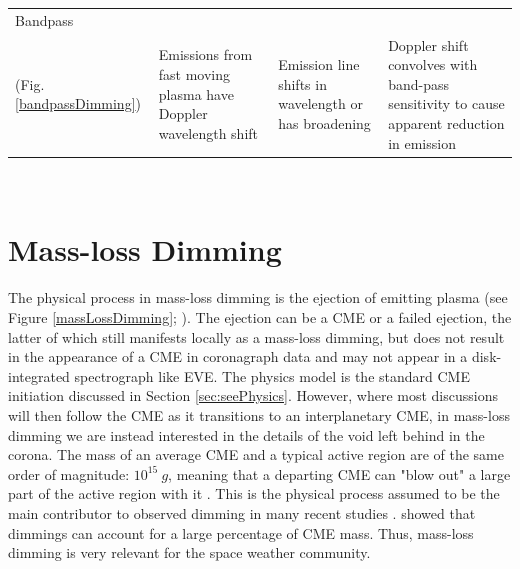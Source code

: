 \begin{table}[!h]
\begin{center}
\begin{tabular}{|p{2.5cm}|p{4cm}|p{4cm}|p{4cm}|}
	Bandpass \\ (Fig. \ref{bandpassDimming}) & Emissions from fast moving plasma have Doppler wavelength shift & Emission line shifts in wavelength or has broadening & Doppler shift convolves with band-pass sensitivity to cause apparent reduction in emission \\ \hline
	
	\end{tabular}
    \\ \rule{0mm}{5mm}
    \end{center}
    \label{tablesummary}
\end{table}

\section{Mass-loss Dimming}
The physical process in mass-loss dimming is the ejection of emitting plasma (see Figure \ref{massLossDimming}; \citealt{Harrison2000, Harra2001}). The ejection can be a CME or a failed ejection, the latter of which still manifests locally as a mass-loss dimming, but does not result in the appearance of a CME in coronagraph data and may not appear in a disk-integrated spectrograph like EVE. The physics model is the standard CME initiation discussed in Section \ref{sec:seePhysics}. However, where most discussions will then follow the CME as it transitions to an interplanetary CME, in mass-loss dimming we are instead interested in the details of the void left behind in the corona. The mass of an average CME and a typical active region are of the same order of magnitude: $10^{15}\ g$, meaning that a departing CME can "blow out" a large part of the active region with it \citep{Aschwanden2009}. This is the physical process assumed to be the main contributor to observed dimming in many recent studies \citep{Sterling1997, Reinard2008, Reinard2009, Aschwanden2009}. \citet{Harrison2003} showed that dimmings can account for a large percentage of CME mass. Thus, mass-loss dimming is very relevant for the space weather community.

